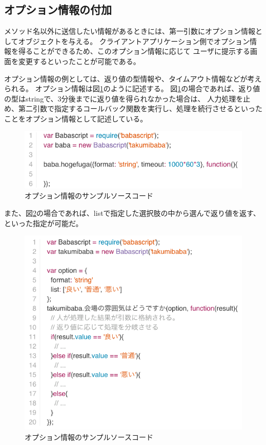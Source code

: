 \subsection{オプション情報の付加}\label{ux30aaux30d7ux30b7ux30e7ux30f3ux60c5ux5831ux306eux4ed8ux52a0}

メソッド名以外に送信したい情報があるときには、第一引数にオプション情報としてオブジェクトを与える。
クライアントアプリケーション側でオプション情報を得ることができるため、このオプション情報に応じて
ユーザに提示する画面を変更するといったことが可能である。

オプション情報の例としては、返り値の型情報や、タイムアウト情報などが考えられる。
オプション情報は図\ref{fig:babascript_option}のように記述する。
図\ref{fig:babascript_option}の場合であれば、返り値の型はstringで、3分後までに返り値を得られなかった場合は、
人力処理を止め、第二引数で指定するコールバック関数を実行し、処理を続行させるといったことをオプション情報として記述している。

\begin{figure}[htbp]
  \begin{center}
  \includegraphics[width=.8\linewidth,bb=0 0 563 149]{images/babascript_option_sample.js.png}
  \end{center}
  \caption{オプション情報のサンプルソースコード}
  \label{fig:babascript_option}
\end{figure}

また、図\ref{fig:babascript_option_list}の場合であれば、listで指定した選択肢の中から選んで返り値を返す、といった指定が可能だ。

\begin{figure}[htbp]
  \begin{center}
  \includegraphics[width=.5\linewidth,bb=0 0 574 513]{images/babascript_option_list.js.png}
  \end{center}
  \caption{オプション情報のサンプルソースコード}
  \label{fig:babascript_option_list}
\end{figure}

